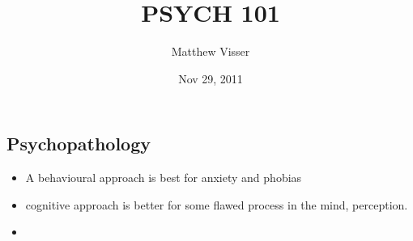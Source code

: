 \documentclass[12pt]{article}
\begin{document}
\title{PSYCH 101}
\author{Matthew Visser}
\date{Nov 29, 2011}
\maketitle

\subsection{Psychopathology}

\begin{itemize}
	\item A behavioural approach is best for anxiety and phobias
	\item cognitive approach is better for some flawed process in the mind,
		perception.
	\item 
\end{itemize}
\end{document}
